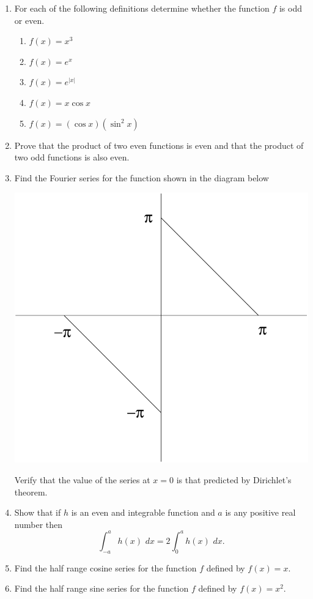 \documentclass[a4paper]{amsart}
\begin{document}
\begin{enumerate}
\item
For each of the following definitions determine whether the function $f$ is odd or even.
\begin{enumerate}
\item
$f(x)=x^3$
\item
$f(x)=e^x$
\item
$f(x)=e^{|x|}$
\item
$f(x)=x \cos x$
\item
$f(x) = (\cos x) (\sin^2 x)$
\end{enumerate}
\item
Prove that the product of two even functions is even and that the product of two odd functions is also even.
\item
Find the Fourier series for the function shown in the diagram below
\begin{center}
\includegraphics[scale=0.5]{sheet15q6.pdf} 
\end{center}
Verify that the value of the series at $x=0$ is that predicted by Dirichlet's theorem. 
\item
Show that if $h$ is an even and integrable function and $a$ is any positive real number then 
$$ \int_{-a}^a h(x) \, \, dx = 2 \int_0^a h(x) \, \, dx.$$
\item
Find the half range cosine series for the function $f$ defined by $f(x)=x$.
\item
Find the half range sine series for the function $f$ defined by $f(x)=x^2$.
\end{enumerate}
\end{document}
